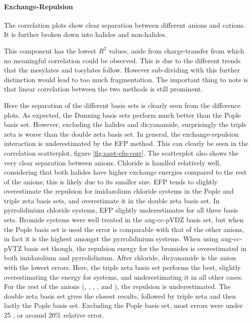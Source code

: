 \begin{footnotesize}
\paragraph{Exchange-Repulsion}
The correlation plots show clear separation between different anions and cations.
It is further broken down into halides and non-halides.

This component has the lowest $R^2$ values, aside from charge-transfer from which no meaningful correlation could be observed. 
This is due to the different trends that the mesylates and tosylates follow. 
However sub-dividing with this further distinction would lead to too much fragmentation. 
The important thing to note is that linear correlation between the two methods is still prominent.

Here the separation of the different basis sets is clearly seen from the difference plots.
As expected, the Dunning basis sets perform much better than the Pople basis set. 
However, excluding the halides and dicyanamide, surprisingly the triple zeta is worse than the double zeta basis set.
In general, the exchange-repulsion interaction is underestimated by the EFP method. 
This can clearly be seen in the correlation scatterplot, figure
\ref{fig:sapt-efp-corr}.
The scatterplot also shows the very clear separation between anions.
Chloride is handled relatively well, considering that both halides have higher exchange energies compared to the rest of the anions; this is likely due to its smaller size.
EFP tends to slightly overestimate the repulsion for imidazolium chloride systems in the Pople and triple zeta basis sets, and overestimate it in the double zeta basis set.
In pyrrolidinium chloride systems, EFP slightly underestimates for all three basis sets. 
Bromide systems were well treated in the aug-cc-pVDZ basis set, but when the Pople basis set is used the error is comparable with that of the other anions, in fact it is the highest amongst the pyrrolidinium systems.
When using aug-cc-pVTZ basis set though, the repulsion energy for the bromides is overestimated in both imidazolium and pyrrolidinium.
After chloride, dicyanamide is the anion with the lowest errors.
Here, the triple zeta basis set performs the best, slightly overestimating the energy for  systems, and underestimating it in all other cases.
For the rest of the anions (\bfl, \mes, \ntf, \pf, and \tos), the repulsion is underestimated. 
The double zeta basis set gives the closest results, followed by triple zeta and then lastly the Pople basis set.
Excluding the Pople basis set, most errors were under 25 \enUnit, or around 20\% relative error.

\end{footnotesize}
